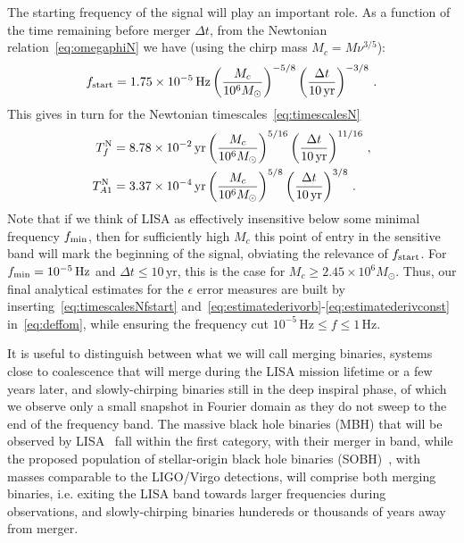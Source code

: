 \documentclass[aps,showpacs,twocolumn,
prd,superscriptaddress,nofootinbib]{revtex4-1}
\newcommand{\be}{\begin{equation}}
\newcommand{\ee}{\end{equation}}
\newcommand{\Hz}{\,\mathrm{Hz}}
\newcommand{\yr}{\,\mathrm{yr}}
\newcommand{\Msol}{M_{\odot}}
\newcommand{\Mchirp}{M_{c}}
\newcommand{\Tf}{T_{f}}
\begin{document}
The starting frequency of the signal will play an important role. As a function of the time remaining before merger $\Delta t$, from the Newtonian relation~\eqref{eq:omegaphiN} we have (using the chirp mass $\Mchirp = M \nu^{3/5}$):
\be\label{eq:fstartN}
	f_{\rm start} = 1.75\times 10^{-5} \Hz \left( \frac{\Mchirp}{10^{6}M_{\odot}} \right)^{-5/8} \left( \frac{\Delta t}{10 \yr} \right)^{-3/8} \,.
\ee
This gives in turn for the Newtonian timescales~\eqref{eq:timescalesN}
\begin{subequations}\label{eq:timescalesNfstart}
\begin{align}
	\Tf^{\rm N} &= 8.78\times10^{-2}\yr \left( \frac{\Mchirp}{10^{6}M_{\odot}} \right)^{5/16} \left( \frac{\Delta t}{10 \yr} \right)^{11/16} \,, \\
	T_{A1}^{\rm N} &= 3.37\times10^{-4}\yr \left( \frac{\Mchirp}{10^{6}M_{\odot}} \right)^{5/8} \left( \frac{\Delta t}{10 \yr} \right)^{3/8} \,.
\end{align}
\end{subequations}
Note that if we think of LISA as effectively insensitive below some minimal frequency $f_{\rm min}$, then for sufficiently high $\Mchirp$ this point of entry in the sensitive band will mark the beginning of the signal, obviating the relevance of $f_{\rm start}$. For $f_{\rm min} = 10^{-5}\Hz$ and $\Delta t \leq 10\yr$, this is the case for $\Mchirp \geq 2.45\times 10^{6}\Msol $. Thus, our final analytical estimates for the $\epsilon$ error measures are built by inserting~\eqref{eq:timescalesNfstart} and~\eqref{eq:estimatederivorb}-\eqref{eq:estimatederivconst} in~\eqref{eq:deffom}, while ensuring the frequency cut $10^{-5}\Hz \leq f \leq 1\Hz$.

It is useful to distinguish between what we will call merging binaries, systems close to coalescence that will merge during the LISA mission lifetime or a few years later, and slowly-chirping binaries still in the deep inspiral phase, of which we observe only a small snapshot in Fourier domain as they do not sweep to the end of the frequency band. The massive black hole binaries (MBH) that will be observed by LISA~\cite{LISA17} fall within the first category, with their merger in band, while the proposed population of stellar-origin black hole binaries (SOBH)~\cite{Sesana16}, with masses comparable to the LIGO/Virgo detections, will comprise both merging binaries, i.e. exiting the LISA band towards larger frequencies during observations, and slowly-chirping binaries hundereds or thousands of years away from merger.
\end{document}
